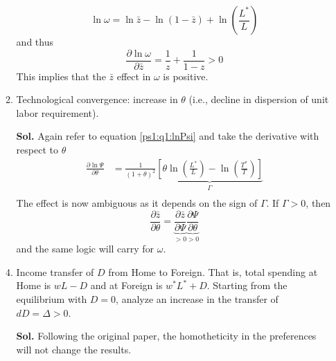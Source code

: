 \documentclass[12pt,oneside,reqno]{amsart}
\begin{document}
\begin{enumerate}[leftmargin=*]
\begin{enumerate}[leftmargin=*]
        \begin{equation*}
            \ln\omega = \ln\bar{z}-\ln(1-\bar{z}) + \ln\left(\frac{L^*}{L}\right)
        \end{equation*}
        and thus 
        \begin{equation*}
            \frac{\partial\ln\omega}{\partial\bar{z}} = \frac{1}{z}+\frac{1}{1-z}>0
        \end{equation*}
        This implies that the $\bar{z}$ effect in $\omega$ is positive. 
        \item Technological convergence: increase in $\theta$ (i.e., decline in dispersion of unit labor requirement).
        \item[\textbf{Sol.}] Again refer to equation \eqref{ps1:q1:lnPsi} and take the derivative with respect to $\theta$
        \begin{align*}
            \frac{\partial\ln\Psi}{\partial\theta} &= \frac{1}{(1+\theta)^2}\underbrace{\left[\theta\ln\left(\frac{L^*}{L}\right)-\ln\left(\frac{T^*}{T}\right)\right]}_{\Gamma}  \\ 
        \end{align*}
        The effect is now ambiguous as it depends on the sign of $\Gamma$. If $\Gamma>0$, then 
        \begin{equation*}
            \frac{\partial\bar{z}}{\partial\theta} = \underbrace{\frac{\partial\bar{z}}{\partial\Psi}}_{>0}\underbrace{\frac{\partial\Psi}{\partial\theta}}_{>0}
        \end{equation*}
        and the same logic will carry for $\omega$. 
        \item Income transfer of $D$ from Home to Foreign. That is, total spending at Home is $w L-D$ and at Foreign is $w^* L^*+D$. Starting from the equilibrium with $D=0$, analyze an increase in the transfer of $d D=\Delta>0$.
        \item[\textbf{Sol.}] Following the original paper, the homotheticity in the preferences will not change the results. 
    \end{enumerate}
\end{enumerate}
\clearpage
\end{document}
